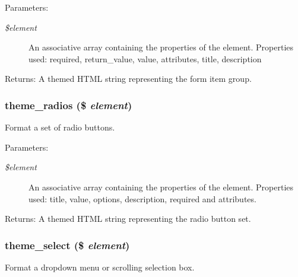 \begin{Desc}
\item[Parameters:]
\begin{description}
\item[{\em \$element}]An associative array containing the properties of the element. Properties used: required, return\_\-value, value, attributes, title, description \end{description}
\end{Desc}
\begin{Desc}
\item[Returns:]A themed HTML string representing the form item group. \end{Desc}
\hypertarget{group__themeable_g4efafeaac5bf313d3b83ac0f8e4df133}{
\subsubsection[{theme\_\-radios}]{\setlength{\rightskip}{0pt plus 5cm}theme\_\-radios (\$ {\em element})}}
\label{group__themeable_g4efafeaac5bf313d3b83ac0f8e4df133}


Format a set of radio buttons.

\begin{Desc}
\item[Parameters:]
\begin{description}
\item[{\em \$element}]An associative array containing the properties of the element. Properties used: title, value, options, description, required and attributes. \end{description}
\end{Desc}
\begin{Desc}
\item[Returns:]A themed HTML string representing the radio button set. \end{Desc}
\hypertarget{group__themeable_g8bd27279d058958f1154af742111807d}{
\subsubsection[{theme\_\-select}]{\setlength{\rightskip}{0pt plus 5cm}theme\_\-select (\$ {\em element})}}
\label{group__themeable_g8bd27279d058958f1154af742111807d}


Format a dropdown menu or scrolling selection box.

